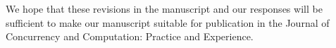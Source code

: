 \documentclass[11pt]{article}
\newcommand\vi{\vspace{\baselineskip}}
\begin{document}
\vi

We hope that these revisions in the manuscript and our responses will be sufficient to make our manuscript suitable for publication in the Journal of Concurrency and Computation: Practice and Experience.







\end{document}
